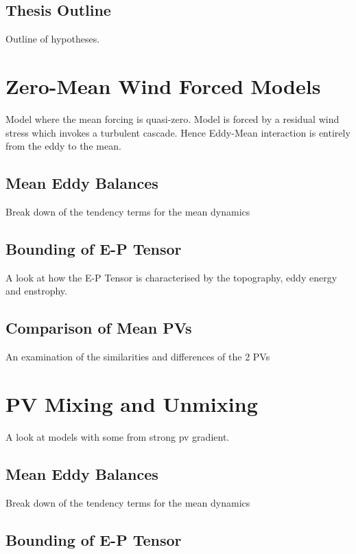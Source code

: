 \documentclass[10pt,a4paper]{article}
\begin{document}
\subsection{Thesis Outline}

Outline of hypotheses.

\section{Zero-Mean Wind Forced Models}

Model where the mean forcing is quasi-zero. 
Model is forced by a residual wind stress which 
invokes a turbulent cascade. Hence Eddy-Mean
interaction is entirely from the eddy to the mean.

\subsection{Mean Eddy Balances}

Break down of the tendency terms for the mean
dynamics

\subsection{Bounding of E-P Tensor}

A look at how the E-P Tensor is characterised by
the topography, eddy energy and enstrophy.

\subsection{Comparison of Mean PVs}

An examination of the similarities and differences
of the 2 PVs

\section{PV Mixing and Unmixing}

A look at models with some from strong pv gradient.

\subsection{Mean Eddy Balances}

Break down of the tendency terms for the mean
dynamics

\subsection{Bounding of E-P Tensor}
\end{document}
